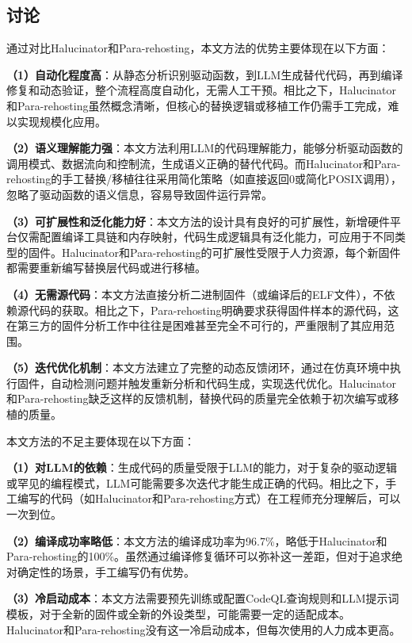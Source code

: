 \subsection{讨论}

通过对比Halucinator和Para-rehosting，本文方法的优势主要体现在以下方面：

\textbf{（1）自动化程度高}：从静态分析识别驱动函数，到LLM生成替代代码，再到编译修复和动态验证，整个流程高度自动化，无需人工干预。相比之下，Halucinator和Para-rehosting虽然概念清晰，但核心的替换逻辑或移植工作仍需手工完成，难以实现规模化应用。

\textbf{（2）语义理解能力强}：本文方法利用LLM的代码理解能力，能够分析驱动函数的调用模式、数据流向和控制流，生成语义正确的替代代码。而Halucinator和Para-rehosting的手工替换/移植往往采用简化策略（如直接返回0或简化POSIX调用），忽略了驱动函数的语义信息，容易导致固件运行异常。

\textbf{（3）可扩展性和泛化能力好}：本文方法的设计具有良好的可扩展性，新增硬件平台仅需配置编译工具链和内存映射，代码生成逻辑具有泛化能力，可应用于不同类型的固件。Halucinator和Para-rehosting的可扩展性受限于人力资源，每个新固件都需要重新编写替换层代码或进行移植。

\textbf{（4）无需源代码}：本文方法直接分析二进制固件（或编译后的ELF文件），不依赖源代码的获取。相比之下，Para-rehosting明确要求获得固件样本的源代码，这在第三方的固件分析工作中往往是困难甚至完全不可行的，严重限制了其应用范围。

\textbf{（5）迭代优化机制}：本文方法建立了完整的动态反馈闭环，通过在仿真环境中执行固件，自动检测问题并触发重新分析和代码生成，实现迭代优化。Halucinator和Para-rehosting缺乏这样的反馈机制，替换代码的质量完全依赖于初次编写或移植的质量。

本文方法的不足主要体现在以下方面：

\textbf{（1）对LLM的依赖}：生成代码的质量受限于LLM的能力，对于复杂的驱动逻辑或罕见的编程模式，LLM可能需要多次迭代才能生成正确的代码。相比之下，手工编写的代码（如Halucinator和Para-rehosting方式）在工程师充分理解后，可以一次到位。

\textbf{（2）编译成功率略低}：本文方法的编译成功率为96.7\%，略低于Halucinator和Para-rehosting的100\%。虽然通过编译修复循环可以弥补这一差距，但对于追求绝对确定性的场景，手工编写仍有优势。

\textbf{（3）冷启动成本}：本文方法需要预先训练或配置CodeQL查询规则和LLM提示词模板，对于全新的固件或全新的外设类型，可能需要一定的适配成本。Halucinator和Para-rehosting没有这一冷启动成本，但每次使用的人力成本更高。

